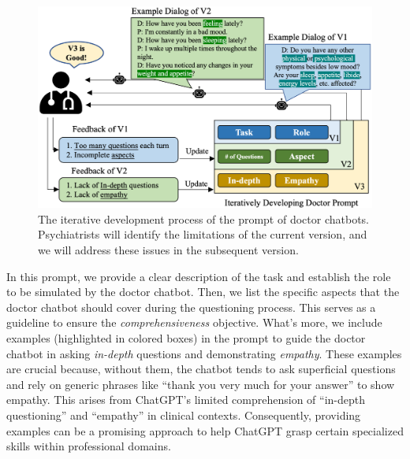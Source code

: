 \begin{figure}[th]
	\centering
	\includegraphics[width=\linewidth]{Figures/doctor_prompt_design.png}
	\caption{The iterative development process of the prompt of doctor chatbots. Psychiatrists will identify the limitations of the current version, and we will address these issues in the subsequent version.}
	\label{fig:doc_prompt_design}
\end{figure}
In this prompt, we provide a clear description of the task and establish the role to be simulated by the doctor chatbot. Then, we list the specific aspects that the doctor chatbot should cover during the questioning process. This serves as a guideline to ensure the \textit{comprehensiveness} objective. What's more, we include examples (highlighted in colored boxes) in the prompt to guide the doctor chatbot in asking \textit{in-depth} questions and demonstrating \textit{empathy}. These examples are crucial because, without them, the chatbot tends to ask superficial questions and  rely on generic phrases like ``thank you very much for your answer'' to show empathy. This arises from ChatGPT's limited comprehension of ``in-depth questioning'' and ``empathy'' in clinical contexts. Consequently, providing examples can be a promising approach to help ChatGPT grasp certain specialized skills within professional domains.


